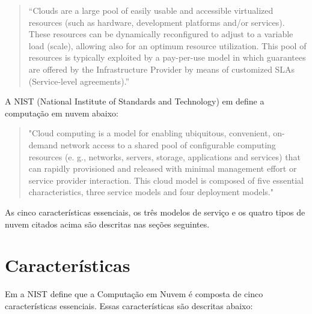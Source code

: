 	\begin{quotation}
		``Clouds are a large pool of easily usable and accessible virtualized resources (such as hardware, development platforms and/or services). These resources can be dynamically reconfigured to adjust to a variable load (scale), allowing also for an optimum resource utilization. This pool of resources is typically exploited by a pay-per-use model in which guarantees are offered by the Infrastructure Provider by means of customized SLAs (Service-level agreements).''
	\end{quotation}
	
	A NIST (National Institute of Standards and Technology) em
        \cite{NIST:2011} define a computação em nuvem  abaixo:
	
	\begin{quotation}
		"Cloud computing is a model for enabling ubiquitous,
                convenient, on-demand network access to a shared pool of
                configurable computing resources (e. g., networks, servers,
                storage, applications and services) that can 
                 rapidly
                provisioned and released with minimal management effort or service provider interaction. This cloud model is composed of five essential characteristics, three service models and four deployment models."
	\end{quotation}	
	
	As cinco características essenciais, os três modelos de serviço e os
        quatro tipos de nuvem citados acima são descritas nas seções seguintes.		

\section{Características} \label{cloud:char}
	Em \cite{NIST:2011} a NIST define que a Computação em Nuvem é composta de cinco características essenciais. Essas características são descritas abaixo:   

